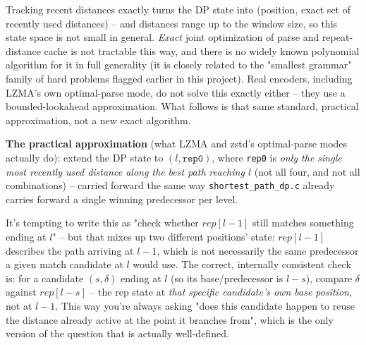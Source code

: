 \documentclass[11pt]{article}
\begin{document}
\begin{tcolorbox}[colback=red!5!white,colframe=red!60!black,title=Honesty check]
Tracking recent distances exactly turns the DP state into (position, exact set of
recently used distances) -- and distances range up to the window size, so this state
space is not small in general. \emph{Exact} joint optimization of parse and
repeat-distance cache is not tractable this way, and there is no widely known
polynomial algorithm for it in full generality (it is closely related to the "smallest
grammar" family of hard problems flagged earlier in this project). Real encoders,
including LZMA's own optimal-parse mode, do not solve this exactly either -- they use a
bounded-lookahead approximation. What follows is that same standard, practical
approximation, not a new exact algorithm.
\end{tcolorbox}

\textbf{The practical approximation} (what LZMA and zstd's optimal-parse modes actually
do): extend the DP state to $(l, \texttt{rep0})$, where \texttt{rep0} is \emph{only the
single most recently used distance along the best path reaching $l$} (not all four, and
not all combinations) -- carried forward the same way \texttt{shortest\_path\_dp.c}
already carries forward a single winning predecessor per level.

\begin{tcolorbox}[colback=red!5!white,colframe=red!60!black,title={A subtlety to get right: check rep0 at the candidate's own base, not at $l-1$}]
It's tempting to write this as "check whether $rep[l-1]$ still matches something ending
at $l$" -- but that mixes up two different positions' state: $rep[l-1]$ describes the
path arriving at $l-1$, which is not necessarily the same predecessor a given match
candidate at $l$ would use. The correct, internally consistent check is: for a
candidate $(s,\delta)$ ending at $l$ (so its base/predecessor is $l-s$), compare $\delta$
against $rep[l-s]$ -- the rep state at \emph{that specific candidate's own base
position}, not at $l-1$. This way you're always asking "does this candidate happen to
reuse the distance already active at the point it branches from", which is the only
version of the question that is actually well-defined.
\end{tcolorbox}
\end{document}
